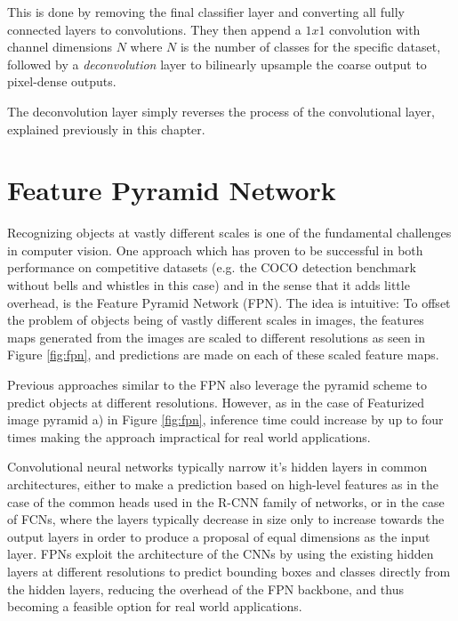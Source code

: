 \documentclass[english, bibtex]{kththesis}
\begin{document}
This is done by removing the final classifier layer and converting all fully connected layers to convolutions. They then append a $ 1 x 1$ convolution with channel dimensions $N$ where $N$ is the number of classes for the specific dataset, followed by a \textit{deconvolution} layer to bilinearly upsample the coarse output to pixel-dense outputs.

The deconvolution layer simply reverses the process of the convolutional layer, explained previously in this chapter.

\section{Feature Pyramid Network}

Recognizing objects at vastly different scales is one of the fundamental challenges in computer vision. One approach which has proven to be successful in both performance on competitive datasets (e.g. the COCO detection benchmark without bells and whistles in this case) and in the sense that it adds little overhead, is the Feature Pyramid Network (FPN). The idea is intuitive: To offset the problem of objects being of vastly different scales in images, the features maps generated from the images are scaled to different resolutions as seen in Figure \ref{fig:fpn}, and predictions are made on each of these scaled feature maps.

Previous approaches similar to the FPN also leverage the pyramid scheme to predict objects at different resolutions. However, as in the case of Featurized image pyramid a) in Figure \ref{fig:fpn}, inference time could increase by up to four times making the approach impractical for real world applications.

Convolutional neural networks typically narrow it’s hidden layers in common architectures, either to make a prediction based on high-level features as in the case of the common heads used in the R-CNN family of networks, or in the case of FCNs, where the layers typically decrease in size only to increase towards the output layers in order to produce a proposal of equal dimensions as the input layer. FPNs exploit the architecture of the CNNs by using the existing hidden layers at different resolutions to predict bounding boxes and classes directly from the hidden layers, reducing the overhead of the FPN backbone, and thus becoming a feasible option for real world applications.
\end{document}
